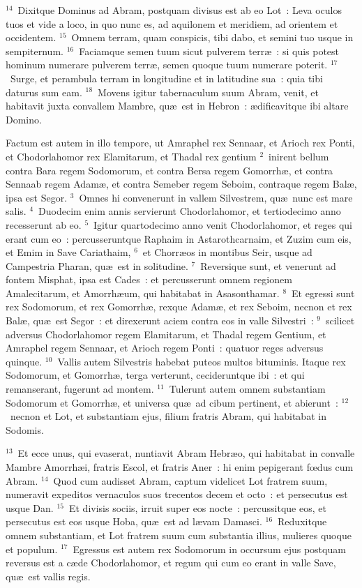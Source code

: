 ${}^{14}$~Dixitque Dominus ad Abram, postquam divisus est ab eo Lot~: Leva oculos tuos et vide a loco, in quo nunc es, ad aquilonem et meridiem, ad orientem et occidentem.
${}^{15}$~Omnem terram, quam conspicis, tibi dabo, et semini tuo usque in sempiternum.
${}^{16}$~Faciamque semen tuum sicut pulverem terr\ae~: si quis potest hominum numerare pulverem terr\ae , semen quoque tuum numerare poterit.
${}^{17}$~Surge, et perambula terram in longitudine et in latitudine sua~: quia tibi daturus sum eam.
${}^{18}$~Movens igitur tabernaculum suum Abram, venit, et habitavit juxta convallem Mambre, qu\ae\ est in Hebron~: \ae dificavitque ibi altare Domino.

\lettrine[lines=3,image=true,loversize=0.05,lraise=-0.03]{F}{}actum est autem in illo tempore, ut Amraphel rex Sennaar, et Arioch rex Ponti, et Chodorlahomor rex Elamitarum, et Thadal rex gentium
${}^{2}$~inirent bellum contra Bara regem Sodomorum, et contra Bersa regem Gomorrh\ae , et contra Sennaab regem Adam\ae , et contra Semeber regem Seboim, contraque regem Bal\ae , ipsa est Segor.
${}^{3}$~Omnes hi convenerunt in vallem Silvestrem, qu\ae\ nunc est mare salis.
${}^{4}$~Duodecim enim annis servierunt Chodorlahomor, et tertiodecimo anno recesserunt ab eo.
${}^{5}$~Igitur quartodecimo anno venit Chodorlahomor, et reges qui erant cum eo~: percusseruntque Raphaim in Astarothcarnaim, et Zuzim cum eis, et Emim in Save Cariathaim,
${}^{6}$~et Chorr\ae os in montibus Seir, usque ad Campestria Pharan, qu\ae\ est in solitudine.
${}^{7}$~Reversique sunt, et venerunt ad fontem Misphat, ipsa est Cades~: et percusserunt omnem regionem Amalecitarum, et Amorrh\ae um, qui habitabat in Asasonthamar.
${}^{8}$~Et egressi sunt rex Sodomorum, et rex Gomorrh\ae , rexque Adam\ae , et rex Seboim, necnon et rex Bal\ae , qu\ae\ est Segor~: et direxerunt aciem contra eos in valle Silvestri~:
${}^{9}$~scilicet adversus Chodorlahomor regem Elamitarum, et Thadal regem Gentium, et Amraphel regem Sennaar, et Arioch regem Ponti~: quatuor reges adversus quinque.
${}^{10}$~Vallis autem Silvestris habebat puteos multos bituminis. Itaque rex Sodomorum, et Gomorrh\ae , terga verterunt, cecideruntque ibi~: et qui remanserant, fugerunt ad montem.
${}^{11}$~Tulerunt autem omnem substantiam Sodomorum et Gomorrh\ae , et universa qu\ae\ ad cibum pertinent, et abierunt~:
${}^{12}$~necnon et Lot, et substantiam ejus, filium fratris Abram, qui habitabat in Sodomis.


${}^{13}$~Et ecce unus, qui evaserat, nuntiavit Abram Hebr\ae o, qui habitabat in convalle Mambre Amorrh\ae i, fratris Escol, et fratris Aner~: hi enim pepigerant fœdus cum Abram.
${}^{14}$~Quod cum audisset Abram, captum videlicet Lot fratrem suum, numeravit expeditos vernaculos suos trecentos decem et octo~: et persecutus est usque Dan.
${}^{15}$~Et divisis sociis, irruit super eos nocte~: percussitque eos, et persecutus est eos usque Hoba, qu\ae\ est ad l\ae vam Damasci.
${}^{16}$~Reduxitque omnem substantiam, et Lot fratrem suum cum substantia illius, mulieres quoque et populum.
${}^{17}$~Egressus est autem rex Sodomorum in occursum ejus postquam reversus est a c\ae de Chodorlahomor, et regum qui cum eo erant in valle Save, qu\ae\ est vallis regis.


